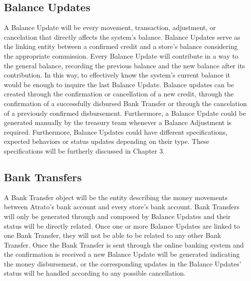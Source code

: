 \subsection{Balance Updates}
A Balance Update will be every movement, transaction, adjustment, or cancelation that directly affects the system’s balance. Balance Updates serve as the linking entity between a confirmed credit and a store’s balance considering the appropriate commission. Every Balance Update will contribute in a way to the general balance, recording the previous balance and the new balance after its contribution. In this way, to effectively know the system’s current balance it would be enough to inquire the last Balance Update.
Balance updates can be created through the confirmation or cancellation of a new credit, through the confirmation of a successfully disbursed Bank Transfer or through the cancelation of a previously confirmed disbursement. Furthermore, a Balance Update could be generated manually by the treasury team whenever a Balance Adjustment is required. Furthermore, Balance Updates could have different specifications, expected behaviors or status updates depending on their type. These specifications will be furtherly discussed in Chapter 3.
\subsection{Bank Transfers} 
A Bank Transfer object will be the entity describing the money movements between Atrato’s bank account and every store’s bank account. Bank Transfers will only be generated through and composed by Balance Updates and their status will be directly related. Once one or more Balance Updates are linked to one Bank Transfer, they will not be able to be related to any other Bank Transfer. Once the Bank Transfer is sent through the online banking system and the confirmation is received a new Balance Update will be generated indicating the money disbursement, or the corresponding updates in the Balance Updates’ status will be handled according to any possible cancellation.
